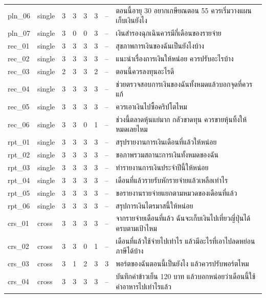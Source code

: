\documentclass[11pt,a4paper]{article}
\begin{document}
{\begin{longtable}{llrrrrrp{7.2cm}}
pln\_\allowbreak{}06 & single & 3 & 3 & 3 & 3 & -- & {\thaifont ตอนนี้อายุ }30 {\thaifont อยากเกษียณตอน }55 {\thaifont ควรเริ่มวางแผนเก็บเงินยังไง} \\
pln\_\allowbreak{}07 & single & 3 & 0 & 0 & 3 & -- & {\thaifont เงินสำรองฉุกเฉินควรมีกี่เดือนของรายจ่าย} \\
rec\_\allowbreak{}01 & single & 3 & 3 & 3 & 3 & -- & {\thaifont สุขภาพการเงินของฉันเป็นยังไงบ้าง} \\
rec\_\allowbreak{}02 & single & 3 & 3 & 3 & 3 & -- & {\thaifont แนะนำเรื่องการเงินให้หน่อย ควรปรับอะไรบ้าง} \\
rec\_\allowbreak{}03 & single & 2 & 3 & 3 & 2 & -- & {\thaifont ตอนนี้ควรลงทุนอะไรดี} \\
rec\_\allowbreak{}04 & single & 3 & 3 & 3 & 3 & -- & {\thaifont ช่วยตรวจสอบการเงินของฉันทั้งหมดแล้วบอกจุดที่ควรแก้} \\
rec\_\allowbreak{}05 & single & 3 & 3 & 3 & 3 & -- & {\thaifont ควรเอาเงินไปซื้อคริปโตไหม} \\
rec\_\allowbreak{}06 & single & 3 & 3 & 0 & 1 & -- & {\thaifont ช่วงนี้ตลาดหุ้นแย่มาก กลัวขาดทุน ควรขายหุ้นทิ้งให้หมดเลยไหม} \\
rpt\_\allowbreak{}01 & single & 3 & 3 & 3 & 3 & -- & {\thaifont สรุปรายงานการเงินเดือนที่แล้วให้หน่อย} \\
rpt\_\allowbreak{}02 & single & 3 & 3 & 3 & 3 & -- & {\thaifont ขอภาพรวมสถานะการเงินทั้งหมดของฉัน} \\
rpt\_\allowbreak{}03 & single & 3 & 3 & 3 & 3 & -- & {\thaifont ทำรายงานการเงินประจำปีนี้ให้หน่อย} \\
rpt\_\allowbreak{}04 & single & 3 & 3 & 3 & 3 & -- & {\thaifont เดือนที่แล้วรายรับหักรายจ่ายแล้วเหลือเท่าไร} \\
rpt\_\allowbreak{}05 & single & 3 & 3 & 3 & 3 & -- & {\thaifont ขอรายงานรายจ่ายแยกตามหมวดของเดือนที่แล้ว} \\
rpt\_\allowbreak{}06 & single & 3 & 3 & 3 & 3 & -- & {\thaifont สรุปการเงินไตรมาสนี้ให้หน่อย} \\
crs\_\allowbreak{}01 & cross & 3 & 3 & 3 & 3 & -- & {\thaifont จากรายจ่ายเดือนที่แล้ว ฉันจะเก็บเงินไปเที่ยวญี่ปุ่นได้ครบตามเป้าไหม} \\
crs\_\allowbreak{}02 & cross & 3 & 3 & 0 & 1 & -- & {\thaifont เดือนที่แล้วใช้จ่ายไปเท่าไร แล้วมีอะไรที่เอาไปลดหย่อนภาษีได้บ้าง} \\
crs\_\allowbreak{}03 & cross & 3 & 1 & 2 & 3 & 3 & {\thaifont พอร์ตของฉันตอนนี้เป็นยังไง แล้วควรปรับพอร์ตไหม} \\
crs\_\allowbreak{}04 & cross & 3 & 3 & 3 & 3 & -- & {\thaifont บันทึกค่าข้าวเย็น }120 {\thaifont บาท แล้วบอกหน่อยว่าเดือนนี้ใช้ค่าอาหารไปเท่าไรแล้ว} \\

\end{longtable}}
\end{document}
